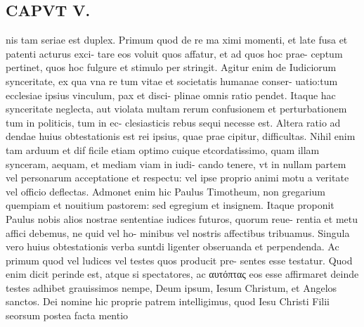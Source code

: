 \documentclass{article}
\begin{document}
\begin{pages}
\section*{CAPVT V. }
\marginpar{[ p.329 ]}\pstart nis tam seriae est duplex. Primum quod de re ma ximi momenti, et late fusa et patenti acturus exci- tare eos voluit quos affatur, et ad quos hoc prae- ceptum pertinet, quos hoc fulgure et stimulo per stringit. Agitur enim de Iudiciorum synceritate, ex qua vna re tum vitae et societatis humanae conser- uatio:tum ecclesiae ipsius vinculum, pax et disci- plinae omnis ratio pendet. Itaque hac synceritate neglecta, aut violata multam rerum confusionem et perturbationem tum in politicis, tum in ec- clesiasticis rebus sequi necesse est. Altera ratio ad dendae huius obtestationis est rei ipsius, quae prae cipitur, difficultas. Nihil enim tam arduum et dif ficile etiam optimo cuique etcordatissimo, quam illam synceram, aequam, et mediam viam in iudi- cando tenere, vt in nullam partem vel personarum acceptatione et respectu: vel ipse proprio animi motu a veritate vel officio deflectas. Admonet enim hic Paulus Timotheum, non gregarium quempiam et nouitium pastorem: sed egregium et insignem. Itaque proponit Paulus nobis alios nostrae sententiae iudices futuros, quorum reue- rentia et metu affici debemus, ne quid vel ho- minibus vel nostris affectibus tribuamus. Singula vero huius obtestationis verba suntdi ligenter obseruanda et perpendenda. Ac primum quod vel ludices vel testes quos producit pre- sentes esse testatur. Quod enim dicit perinde est, atque si spectatores, ac αυτόπτας eos esse affirmaret deinde testes adhibet grauissimos nempe, Deum ipsum, Iesum Christum, et Angelos sanctos. Dei nomine hic proprie patrem intelligimus, quod Iesu Christi Filii seorsum postea facta mentio  \pend

\end{pages}
\end{document}
